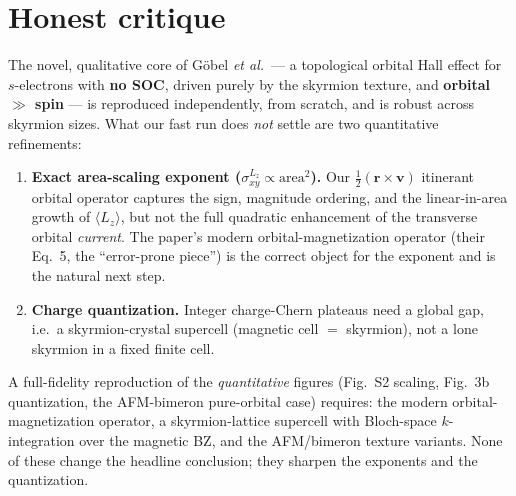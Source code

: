 \documentclass[11pt]{article}
\newcommand{\sigLz}{\sigma^{L_z}_{xy}}
\begin{document}
\section{Honest critique}
\label{sec:failure}
The novel, qualitative core of Göbel \emph{et al.}\ --- a topological orbital Hall effect
for $s$-electrons with \textbf{no SOC}, driven purely by the skyrmion texture, and
\textbf{orbital $\gg$ spin} --- is reproduced independently, from scratch, and is robust
across skyrmion sizes. What our fast run does \emph{not} settle are two quantitative
refinements:
\begin{enumerate}
  \item \textbf{Exact area-scaling exponent ($\sigLz\propto\text{area}^2$).} Our
  $\tfrac12(\mathbf r\times\mathbf v)$ itinerant orbital operator captures the sign,
  magnitude ordering, and the linear-in-area growth of $\langle L_z\rangle$, but not the
  full quadratic enhancement of the transverse orbital \emph{current}. The paper's modern
  orbital-magnetization operator (their Eq.~5, the ``error-prone piece'') is the correct
  object for the exponent and is the natural next step.
  \item \textbf{Charge quantization.} Integer charge-Chern plateaus need a global gap,
  i.e.\ a skyrmion-crystal supercell (magnetic cell $=$ skyrmion), not a lone skyrmion in
  a fixed finite cell.
\end{enumerate}
A full-fidelity reproduction of the \emph{quantitative} figures (Fig.~S2 scaling, Fig.~3b
quantization, the AFM-bimeron pure-orbital case) requires: the modern orbital-magnetization
operator, a skyrmion-lattice supercell with Bloch-space $k$-integration over the magnetic
BZ, and the AFM/bimeron texture variants. None of these change the headline conclusion;
they sharpen the exponents and the quantization.
\end{document}
